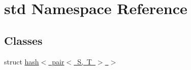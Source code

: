 \hypertarget{namespacestd}{}\section{std Namespace Reference}
\label{namespacestd}
\subsection*{Classes}
\begin{DoxyCompactItemize}
\item 
struct \mbox{\hyperlink{structstd_1_1hash_3_01pair_3_01S_00_01T_01_4_01_4}{hash$<$ pair$<$ S, T $>$ $>$}}
\end{DoxyCompactItemize}
